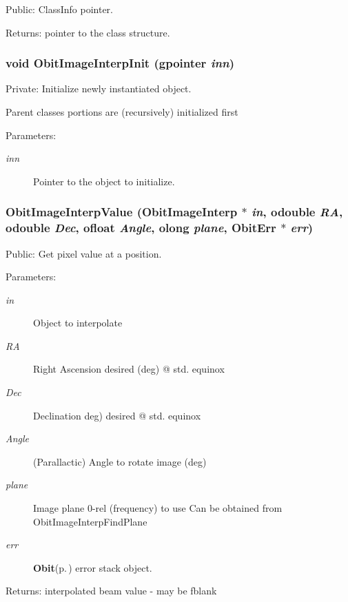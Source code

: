 Public: Class\-Info pointer. 

\begin{Desc}
\item[Returns:]pointer to the class structure. \end{Desc}
\subsubsection{\setlength{\rightskip}{0pt plus 5cm}void Obit\-Image\-Interp\-Init (gpointer {\em inn})}\label{ObitImageInterp_8c_a3}


Private: Initialize newly instantiated object. 

Parent classes portions are (recursively) initialized first \begin{Desc}
\item[Parameters:]
\begin{description}
\item[{\em inn}]Pointer to the object to initialize. \end{description}
\end{Desc}
\subsubsection{ Obit\-Image\-Interp\-Value ({\bf Obit\-Image\-Interp} $\ast$ {\em in}, {\bf odouble} {\em RA}, {\bf odouble} {\em Dec}, {\bf ofloat} {\em Angle}, {\bf olong} {\em plane}, {\bf Obit\-Err} $\ast$ {\em err})}\label{ObitImageInterp_8c_a12}


Public: Get pixel value at a position. 

\begin{Desc}
\item[Parameters:]
\begin{description}
\item[{\em in}]Object to interpolate \item[{\em RA}]Right Ascension desired (deg) @ std. equinox \item[{\em Dec}]Declination deg) desired @ std. equinox \item[{\em Angle}](Parallactic) Angle to rotate image (deg) \item[{\em plane}]Image plane 0-rel (frequency) to use Can be obtained from Obit\-Image\-Interp\-Find\-Plane \item[{\em err}]{\bf Obit}{\rm (p.\,\pageref{structObit})} error stack object. \end{description}
\end{Desc}
\begin{Desc}
\item[Returns:]interpolated beam value - may be fblank \end{Desc}
